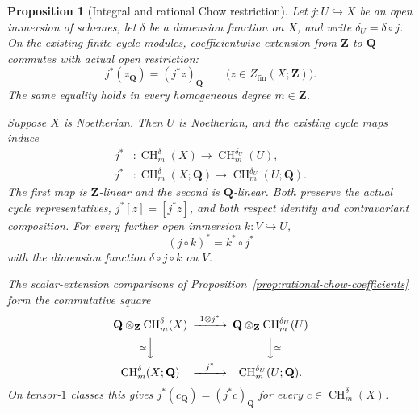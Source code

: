 \documentclass[11pt]{article}
\newtheorem{proposition}[theorem]{Proposition}
\theoremstyle{definition}
\theoremstyle{remark}
\begin{document}
\begin{proposition}[Integral and rational Chow restriction]
\label{prop:open-chow-restriction}
Let \(j:U\hookrightarrow X\) be an open immersion of schemes,
let \(\delta\) be a dimension function on \(X\), and write
\(\delta_U=\delta\circ j\). On the existing finite-cycle modules,
coefficientwise extension from \(\mathbf Z\) to \(\mathbf Q\)
commutes with actual open restriction:
\[
 j^*(z_{\mathbf Q})=(j^*z)_{\mathbf Q}
       \qquad\bigl(z\in Z_{\mathrm{fin}}(X;\mathbf Z)\bigr).
\]
The same equality holds in every homogeneous degree \(m\in\mathbf Z\).

Suppose \(X\) is Noetherian. Then \(U\) is Noetherian, and the
existing cycle maps induce
\[
\begin{aligned}
 j^*&:\operatorname{CH}_m^\delta(X)
           \longrightarrow\operatorname{CH}_m^{\delta_U}(U),\\
 j^*&:\operatorname{CH}_m^\delta(X;\mathbf Q)
           \longrightarrow\operatorname{CH}_m^{\delta_U}(U;\mathbf Q).
\end{aligned}
\]
The first map is \(\mathbf Z\)-linear and the second is
\(\mathbf Q\)-linear. Both preserve the actual cycle representatives,
\(j^*[z]=[j^*z]\), and both respect identity and contravariant
composition. For every further open immersion \(k:V\hookrightarrow U\),
\[
 (j\circ k)^*=k^*\circ j^*
\]
with the dimension function \(\delta\circ j\circ k\) on \(V\).

The scalar-extension comparisons of
Proposition~\ref{prop:rational-chow-coefficients} form the commutative square
\[
\begin{CD}
 \mathbf Q\otimes_{\mathbf Z}\operatorname{CH}_m^\delta(X)
   @>{1\otimes j^*}>>
 \mathbf Q\otimes_{\mathbf Z}\operatorname{CH}_m^{\delta_U}(U)\\
 @V{\simeq}VV @VV{\simeq}V\\
 \operatorname{CH}_m^\delta(X;\mathbf Q)
   @>{j^*}>> \operatorname{CH}_m^{\delta_U}(U;\mathbf Q).
\end{CD}
\]
On tensor-\(1\) classes this gives
\(j^*(c_{\mathbf Q})=(j^*c)_{\mathbf Q}\) for every
\(c\in\operatorname{CH}_m^\delta(X)\).
\end{proposition}
\end{document}
